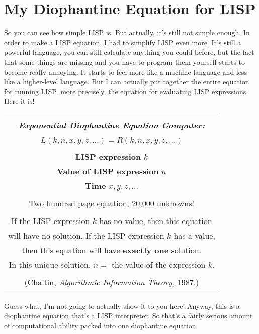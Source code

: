 \documentclass[12pt]{book}
\begin{document}
\section*{My Diophantine Equation for LISP}

So you can see how simple LISP is. But actually, it's still not simple enough.
In order to make a LISP equation, I had to simplify LISP even more.
It's still a powerful language, you can still calculate anything you could before,
but the fact that some things are missing and you have to program them yourself
starts to become really annoying.
It starts to feel more like a machine language and less like a higher-level language.
But I can actually put together the entire equation for running LISP, more precisely,
the equation for evaluating LISP expressions.
Here it is!

\begin{center}
\begin{tabular}{|c|}
\hline
\\
\textbf{\emph{\large Exponential Diophantine Equation Computer:}}
\\ \\
   $L(k, n, x, y, z, \ldots) = R(k, n, x, y, z, \ldots)$
\\ \\
\textbf{LISP expression} $k$
\\
\textbf{Value of LISP expression} $n$
\\
\textbf{Time} $x, y, z, \ldots$
\\ \\
Two hundred page equation, 20,000 unknowns!
\\ \\
If the LISP expression $k$ has no value, then this equation 
\\
will have no solution. If the LISP expression $k$ has a value, 
\\
then this equation will have \textbf{exactly one} solution.
\\
In this unique solution, $n =$ the value of the expression $k$.
\\ \\
(Chaitin, \emph{Algorithmic Information Theory,} 1987.)
\\
\\
\hline
\end{tabular}
\end{center}

Guess what, I'm not going to actually show it to you here!
Anyway, this is a diophantine equation that's a LISP interpreter.
So that's a fairly serious amount of computational ability
packed into one diophantine equation.
 
\end{document}
